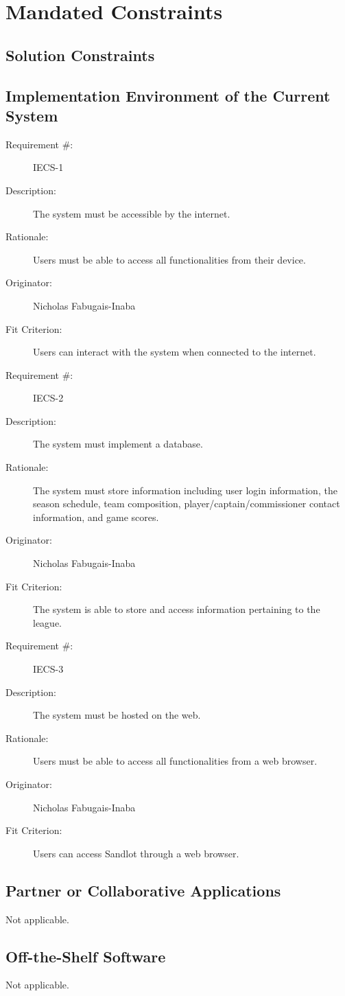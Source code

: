 \documentclass[12pt]{article}
\newenvironment{myreq}[1]{%
\setlist[description]{font=\normalfont\color{darkgray}}%
\begin{tcolorbox}[colframe=black,colback=white, sharp corners, boxrule=1pt]%
\bfseries\color{blue}%
\begin{description}#1}%
{\end{description}\end{tcolorbox}}
\newcommand{\twoinline}[2]{\begin{multicols}{2}#1 #2\end{multicols}}
\newcommand{\reqno}{\item[Requirement \#:]}
\newcommand{\reqdesc}{\item[Description:]}
\newcommand{\reqrat}{\item[Rationale:]}
\newcommand{\reqorig}{\item[Originator:]}
\newcommand{\reqfit}{\item[Fit Criterion:]}
\newcommand{\reqsatis}{\item[Customer Satisfaction:]}
\newcommand{\reqdissat}{\item[Customer Dissatisfaction:]}
\begin{document}
\section{Mandated Constraints}
\subsection{Solution Constraints}

\subsection{Implementation Environment of the Current System}

\begin{myreq}
  \reqno IECS-1
  \reqdesc The system must be accessible by the internet.
  \reqrat Users must be able to access all functionalities from
  their device.
  \reqorig Nicholas Fabugais-Inaba
  \reqfit Users can interact with the system when connected to the
  internet.
  \twoinline
    {\reqsatis 5}
    {\reqdissat 5}
\end{myreq}

\begin{myreq}
  \reqno IECS-2
  \reqdesc The system must implement a database.
  \reqrat The system must store information including user login
  information, the season schedule, team composition,
  player/captain/commissioner contact information, and game scores.
  \reqorig Nicholas Fabugais-Inaba
  \reqfit The system is able to store and access information pertaining
  to the league.
  \twoinline
    {\reqsatis 5}
    {\reqdissat 5}
\end{myreq}

\begin{myreq}
  \reqno IECS-3
  \reqdesc The system must be hosted on the web.
  \reqrat Users must be able to access all functionalities from a web browser.
  \reqorig Nicholas Fabugais-Inaba
  \reqfit Users can access Sandlot through a web browser.
  \twoinline
    {\reqsatis 5}
    {\reqdissat 5}
\end{myreq}

\subsection{Partner or Collaborative Applications}
Not applicable.
\subsection{Off-the-Shelf Software}
Not applicable.
\end{document}
